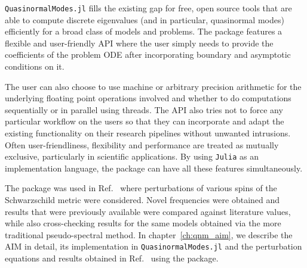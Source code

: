 \texttt{QuasinormalModes.jl} fills the existing gap for free, open source tools that are able to compute discrete eigenvalues (and in particular, quasinormal modes) efficiently for a broad class of models and problems. The package features a flexible and user-friendly \ac{API} where the user simply needs to provide the coefficients of the problem \ac{ODE} after incorporating boundary and asymptotic conditions on it.

The user can also choose to use machine or arbitrary precision arithmetic for the underlying floating point operations involved and whether to do computations sequentially or in parallel using threads. The \ac{API} also tries not to force any particular workflow on the users so that they can incorporate and adapt the existing functionality on their research pipelines without unwanted intrusions.
Often user-friendliness, flexibility and performance are treated as mutually exclusive, particularly in scientific applications. By using \texttt{Julia} as an implementation language, the package can have all these features simultaneously.

The package was used in Ref.~\cite{Mamani2022} where perturbations of various spins of the Schwarzschild metric were considered. Novel frequencies were obtained and results that were previously available were compared against literature values, while also cross-checking results for the same models obtained via the more traditional pseudo-spectral method.
In chapter~\ref{ch:qnm_aim}, we describe the \ac{AIM} in detail, its implementation in \texttt{QuasinormalModes.jl} and the perturbation equations and results obtained in Ref.~\cite{Mamani2022} using the package.